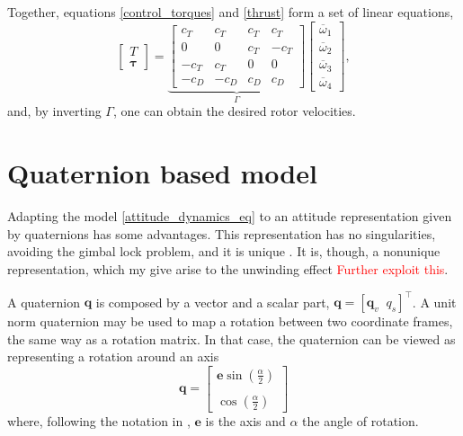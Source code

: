 		Together, equations \eqref{control_torques} and \eqref{thrust} form a set of linear equations,
		\begin{equation}
			\begin{bmatrix}
				T \\
				\boldsymbol \tau
			\end{bmatrix} = \underbrace{\begin{bmatrix}
						c_T & c_T & c_T & c_T\\
						0   &  0  & c_T & -c_T\\
						-c_T& c_T & 0   &  0 \\
						-c_D& -c_D& c_D & c_D
					\end{bmatrix}}_\Gamma
					\begin{bmatrix}
						\overline{\omega}_1\\
						\overline{\omega}_2\\
						\overline{\omega}_3\\
						\overline{\omega}_4
					\end{bmatrix},
			\label{thrust_torques_matrix}
		\end{equation}
		and, by inverting $\Gamma$, one can obtain the desired rotor velocities.
		
\section{Quaternion based model}
	Adapting the model \eqref{attitude_dynamics_eq} to an attitude representation given by quaternions has some advantages. This representation has no singularities, avoiding the gimbal lock problem, and it is unique \cite{rigid_attitude_control} \cite{survey_attitude}. It is, though, a nonunique representation, which my give arise to the unwinding effect \cite{rigid_attitude_control} \textcolor{red}{Further exploit this}.
	
	A quaternion $\mathbf{q}$ is composed by a vector and a scalar part, $\mathbf{q} = \left [\mathbf{q}_v\;\;q_s \right]^\top$. A unit norm quaternion may be used to map a rotation between two coordinate frames, the same way as a rotation matrix. In that case, the quaternion can be viewed as representing a rotation around an axis
	\begin{equation}
		\mathbf{q} = \begin{bmatrix}
				\mathbf{e} \sin \left (\displaystyle\frac{\alpha}{2} \right)\\\\
				\cos \left (\displaystyle\frac{\alpha}{2} \right)
			     \end{bmatrix}
	 	\label{quaternion_eq}
	 \end{equation}
	 where, following the notation in \cite{lohmann_attitude}, $\mathbf{e}$ is the axis and $\alpha$ the angle of rotation.
	 
